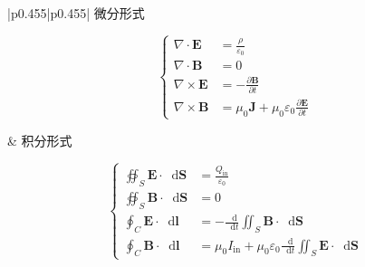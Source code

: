 \documentclass[UTF8,fontset=fandol,zihao=5]{ctexart}
\newcommand{\vect}[1]{\bm{#1}}
\newcommand{\dif}{\mathop{}\!\mathrm{d}}
\begin{document}
\small
\renewcommand{\arraystretch}{1.15}
\begin{longtable}{|p{}|p{}|}
\hline
\centering 微分形式

\[
\left\{
\begin{aligned}
\nabla\cdot\vect{E} &= \frac{\rho}{\varepsilon_0}\\
\nabla\cdot\vect{B} &= 0\\
\nabla\times\vect{E} &= -\frac{\partial\vect{B}}{\partial t}\\
\nabla\times\vect{B} &= \mu_0\vect{J}
+\mu_0\varepsilon_0\frac{\partial\vect{E}}{\partial t}
\end{aligned}
\right.
\]\par\strut

& \centering\arraybackslash 积分形式

\[
\left\{
\begin{aligned}
\oiint_S \vect{E}\cdot\dif \vect{S}
&= \frac{Q_{\mathrm{in}}}{\varepsilon_0}\\
\oiint_S \vect{B}\cdot\dif \vect{S}
&= 0\\
\oint_C \vect{E}\cdot\dif \vect{l}
&= -\frac{\dif}{\dif t}
\iint_S \vect{B}\cdot\dif \vect{S}\\
\oint_C \vect{B}\cdot\dif \vect{l}
&= \mu_0 I_{\mathrm{in}}
+\mu_0\varepsilon_0\frac{\dif}{\dif t}
\iint_S \vect{E}\cdot\dif \vect{S}
\end{aligned}
\right.
\]\par\strut

\\ \hline


\end{longtable}
\end{document}

